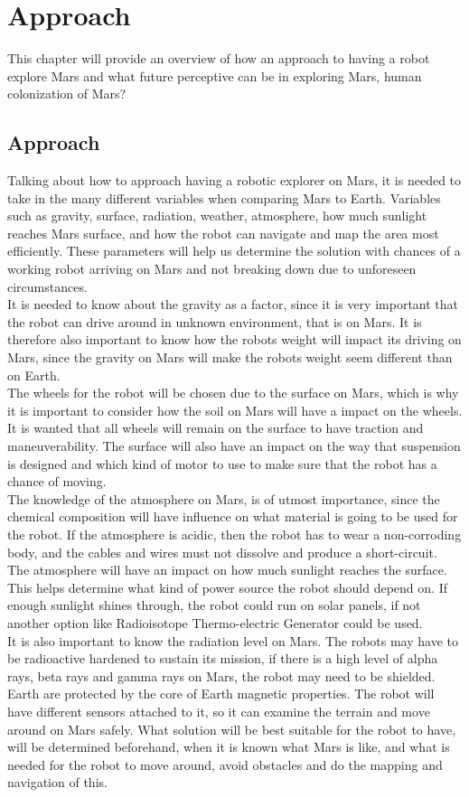\chapter{Approach}\label{ch:approachPerspective}
This chapter will provide an overview of how an approach to having a robot explore Mars and what future perceptive can be in exploring Mars, human colonization of Mars?


\section{Approach}
Talking about how to approach having a robotic explorer on Mars, it is needed to take in the many different variables when comparing Mars to Earth. Variables such as gravity, surface, radiation, weather, atmosphere, how much sunlight reaches Mars surface, and how the robot can navigate and map the area most efficiently. These parameters will help us determine the solution with chances of a working robot arriving on Mars and not breaking down due to unforeseen circumstances.\\
It is needed to know about the gravity as a factor, since it is very important that the robot can drive around in unknown environment, that is on Mars. It is therefore also important to know how the robots weight will impact its driving on Mars, since the gravity on Mars will make the robots weight seem different than on Earth.\\ 
The wheels for the robot will be chosen due to the surface on Mars, which is why it is important to consider how the soil on Mars will have a impact on the wheels. It is wanted that all wheels will remain on the surface to have traction and maneuverability. The surface will also have an impact on the way that suspension is designed and which kind of motor to use to make sure that the robot has a chance of moving.\\
The knowledge of the atmosphere on Mars, is of utmost importance, since the chemical composition will have influence on what material is going to be used for the robot. If the atmosphere is acidic, then the robot has to wear a non-corroding body, and the cables and wires must not dissolve and produce a short-circuit.\\ 
The atmosphere will have an impact on how much sunlight reaches the surface. This helps determine what kind of power source the robot should depend on. If enough sunlight shines through, the robot could run on solar panels, if not another option like Radioisotope Thermo-electric Generator could be used.\\
It is also important to know the radiation level on Mars. The robots may have to be radioactive hardened to sustain its mission, if there is a high level of alpha rays, beta rays and gamma rays on Mars, the robot may need to be shielded. Earth are protected by the core of Earth magnetic properties.
The robot will have different sensors attached to it, so it can examine the terrain and move around on Mars safely. What solution will be best suitable for the robot to have, will be determined beforehand, when it is known what Mars is like, and what is needed for the robot to move around, avoid obstacles and do the mapping and navigation of this\cite{WhatAreCosmicRays?}\cite{mmtg}.

